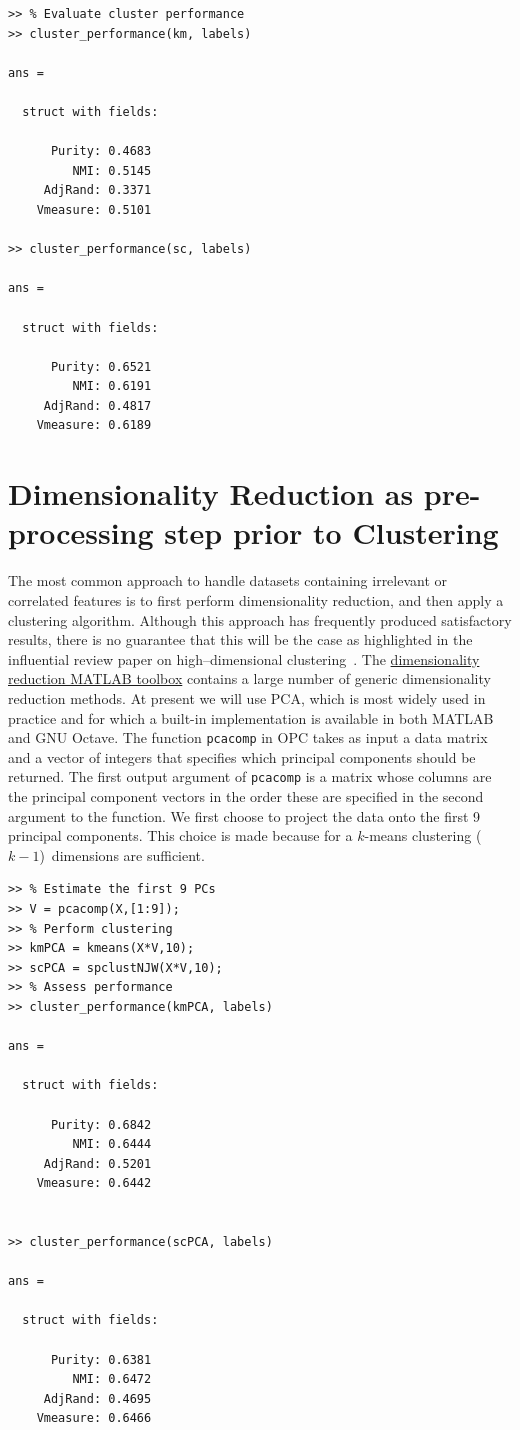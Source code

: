 \documentclass{book}
\begin{document}
\begin{verbatim}
>> % Evaluate cluster performance
>> cluster_performance(km, labels)

ans = 

  struct with fields:

      Purity: 0.4683
         NMI: 0.5145
     AdjRand: 0.3371
    Vmeasure: 0.5101

>> cluster_performance(sc, labels)

ans = 

  struct with fields:

      Purity: 0.6521
         NMI: 0.6191
     AdjRand: 0.4817
    Vmeasure: 0.6189

\end{verbatim}



\section{Dimensionality Reduction as pre-processing step prior to Clustering}

The most common approach to handle datasets containing irrelevant or correlated
features is to first perform dimensionality reduction, and then apply a
clustering algorithm. Although this approach has frequently produced
satisfactory results, there is no guarantee that this will be the case as highlighted
in the influential review paper on high--dimensional clustering~\cite{KriegelKZ2009}.
%
The \href{https://lvdmaaten.github.io/drtoolbox/}{dimensionality reduction MATLAB
toolbox}
%
contains a large number of generic dimensionality reduction methods. At present we
will use PCA, which is most widely used in practice
and for which a built-in implementation is available in both MATLAB and GNU Octave.
%
The function {\tt pcacomp} in OPC takes as input a data matrix and a vector
of integers that specifies which principal components should be returned.
The first output argument of
{\tt pcacomp} is a matrix whose columns are the principal
component vectors in the order these are specified in the second argument
to the function.
%
We first choose to project the data onto the first 9 principal
components. This choice is made because for a $k$-means clustering 
($k-1$)~dimensions are sufficient.

\begin{verbatim}
>> % Estimate the first 9 PCs
>> V = pcacomp(X,[1:9]);
>> % Perform clustering
>> kmPCA = kmeans(X*V,10);
>> scPCA = spclustNJW(X*V,10);
>> % Assess performance
>> cluster_performance(kmPCA, labels)

ans = 

  struct with fields:

      Purity: 0.6842
         NMI: 0.6444
     AdjRand: 0.5201
    Vmeasure: 0.6442


>> cluster_performance(scPCA, labels)

ans = 

  struct with fields:

      Purity: 0.6381
         NMI: 0.6472
     AdjRand: 0.4695
    Vmeasure: 0.6466

\end{verbatim}
\end{document}
